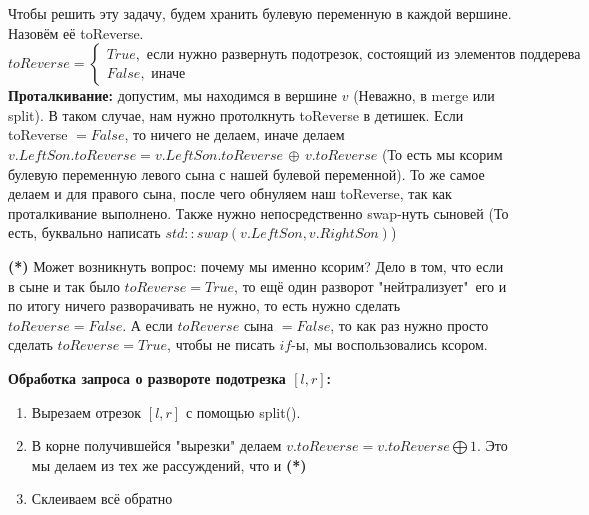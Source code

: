 Чтобы решить эту задачу, будем хранить булевую переменную в каждой вершине. Назовём её toReverse. 
\begin{equation*}
    toReverse = 
    \begin{cases}
        True, \text{ если нужно развернуть подотрезок, состоящий из элементов поддерева вершины}\\
        False, \text{ иначе}
    \end{cases}
\end{equation*}
\textbf{Проталкивание:} допустим, мы находимся в вершине $v$ (Неважно, в merge или split). В таком случае, нам нужно протолкнуть toReverse в детишек. Если toReverse $= False$, то ничего не делаем, иначе делаем $v.LeftSon.toReverse = v.LeftSon.toReverse\, \oplus \,v.toReverse$ (То есть мы ксорим булевую переменную левого сына с нашей булевой переменной). То же самое делаем и для правого сына, после чего обнуляем наш toReverse, так как проталкивание выполнено. Также нужно непосредственно swap-нуть сыновей (То есть, буквально написать $std::swap(v.LeftSon, v.RightSon)$)

\textbf{(*)} Может возникнуть вопрос: почему мы именно ксорим? Дело в том, что если в сыне и так было $toReverse = True$, то ещё один разворот "нейтрализует"\ его и по итогу ничего разворачивать не нужно, то есть нужно сделать $toReverse = False$. А если $toReverse$ сына $= False$, то как раз нужно просто сделать $toReverse = True$, чтобы не писать $if$-ы, мы воспользовались ксором.

\textbf{Обработка запроса о развороте подотрезка $[l, r]$:}
\begin{enumerate}
    \item Вырезаем отрезок $[l, r]$ с помощью split().
    \item В корне получившейся "вырезки" делаем $v.toReverse = v.toReverse \bigoplus 1$. Это мы делаем из тех же рассуждений, что и \textbf{(*)}
    \item Склеиваем всё обратно
\end{enumerate}
\pagebreak
